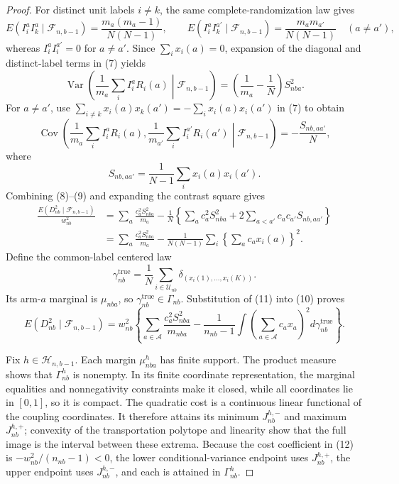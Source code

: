 \documentclass{article}
\begin{document}
\begin{proof}
For distinct unit labels \(i\ne k\), the same complete-randomization law gives
\[
E(I_i^aI_k^a\mid\mathcal F_{n,b-1})
=\frac{m_a(m_a-1)}{N(N-1)},
\qquad
E(I_i^aI_k^{a'}\mid\mathcal F_{n,b-1})
=\frac{m_am_{a'}}{N(N-1)}\quad(a\ne a'),
\tag{7}
\]
whereas \(I_i^aI_i^{a'}=0\) for \(a\ne a'\). Since \(\sum_i x_i(a)=0\), expansion of the diagonal and distinct-label terms in (7) yields
\[
\operatorname{Var}\!\left(\frac1{m_a}\sum_iI_i^aR_i(a)\middle|\mathcal F_{n,b-1}\right)
=\left(\frac1{m_a}-\frac1N\right)S_{nba}^2.
\tag{8}
\]
For \(a\ne a'\), use
\(\sum_{i\ne k}x_i(a)x_k(a')=-\sum_i x_i(a)x_i(a')\) in (7) to obtain
\[
\operatorname{Cov}\!\left(\frac1{m_a}\sum_iI_i^aR_i(a),
\frac1{m_{a'}}\sum_iI_i^{a'}R_i(a')\middle|\mathcal F_{n,b-1}\right)
=-\frac{S_{nb,aa'}}N,
\tag{9}
\]
where
\[
S_{nb,aa'}=\frac1{N-1}\sum_i x_i(a)x_i(a').
\]
Combining (8)--(9) and expanding the contrast square gives
\[
\begin{aligned}
\frac{E(D_{nb}^2\mid\mathcal F_{n,b-1})}{w_{nb}^2}
&=\sum_a\frac{c_a^2S_{nba}^2}{m_a}
-\frac1N\left\{\sum_ac_a^2S_{nba}^2+2\sum_{a<a'}c_ac_{a'}S_{nb,aa'}\right\}\\
&=\sum_a\frac{c_a^2S_{nba}^2}{m_a}
-\frac1{N(N-1)}\sum_i\left\{\sum_ac_ax_i(a)\right\}^2.
\end{aligned}
\tag{10}
\]
Define the common-label centered law
\[
\gamma_{nb}^{\mathrm{true}}
=\frac1N\sum_{i\in\mathcal U_{nb}}
\delta_{(x_i(1),\ldots,x_i(K))}.
\tag{11}
\]
Its arm-\(a\) marginal is \(\mu_{nba}\), so \(\gamma_{nb}^{\mathrm{true}}\in\Gamma_{nb}\). Substitution of (11) into (10) proves
\[
E(D_{nb}^2\mid\mathcal F_{n,b-1})
=w_{nb}^2\left\{\sum_{a\in\mathcal A}\frac{c_a^2S_{nba}^2}{m_{nba}}
-\frac1{n_{nb}-1}\int\left(\sum_{a\in\mathcal A}c_ax_a\right)^2d\gamma_{nb}^{\mathrm{true}}\right\}.
\tag{12}
\]

Fix \(h\in\mathcal H_{n,b-1}\). Each margin \(\mu_{nba}^h\) has finite support. The product measure shows that \(\Gamma_{nb}^h\) is nonempty. In its finite coordinate representation, the marginal equalities and nonnegativity constraints make it closed, while all coordinates lie in \([0,1]\), so it is compact. The quadratic cost is a continuous linear functional of the coupling coordinates. It therefore attains its minimum \(J_{nb}^{h,-}\) and maximum \(J_{nb}^{h,+}\); convexity of the transportation polytope and linearity show that the full image is the interval between these extrema. Because the cost coefficient in (12) is \(-w_{nb}^2/(n_{nb}-1)<0\), the lower conditional-variance endpoint uses \(J_{nb}^{h,+}\), the upper endpoint uses \(J_{nb}^{h,-}\), and each is attained in \(\Gamma_{nb}^h\).


\end{proof}
\end{document}
